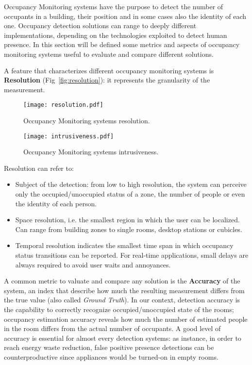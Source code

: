 Occupancy Monitoring systems have the purpose to detect the number of occupants in a building, their position and in some cases also the identity of each one.
Occupancy detection solutions can range to deeply different implementations, depending on the technologies exploited to detect human presence. In this section will be defined some metrics and aspects of occupancy monitoring systems useful to evaluate and compare different solutions.

\medskip
A feature that characterizes different occupancy monitoring systems is \textbf{Resolution} (Fig~\ref{fig:resolution}): it represents the granularity of the measurement.

\begin{figure*}
\center

  \texttt{[image: resolution.pdf]}
  \caption{Occupancy Monitoring systems resolution.}\label{fig:resolution}
\endminipage\hfill
{}%
  \texttt{[image: intrusiveness.pdf]}
  \caption{Occupancy Monitoring systems intrusiveness.}\label{fig:intrusiveness}
\endminipage
\end{figure*}

Resolution can refer to:
\begin{itemize}
\item Subject of the detection: from low to high resolution, the system can perceive only the occupied/unoccupied status of a zone, the number of people or even the identity of each person.
\item Space resolution, i.e. the smallest region in which the user can be localized. Can range from building zones to single rooms, desktop stations or cubicles.
\item Temporal resolution indicates the smallest time span in which occupancy status transitions can be reported. For real-time applications, small delays are always required to avoid user waits and annoyances.
\end{itemize}

\medskip
A common metric to valuate and compare any solution is the \textbf{Accuracy} of the system, an index that describe how much the resulting measurement differs from the true value (also called \emph{Ground Truth}). In our context, detection accuracy is the capability to correctly recognize occupied/unoccupied state of the rooms; occupancy estimation accuracy reveals how much the number of estimated people in the room differs from the actual number of occupants. A good level of accuracy is essential for almost every detection systems: as instance, in order to reach energy waste reduction, false positive presence detections can be counterproductive since appliances would be turned-on in empty rooms.

